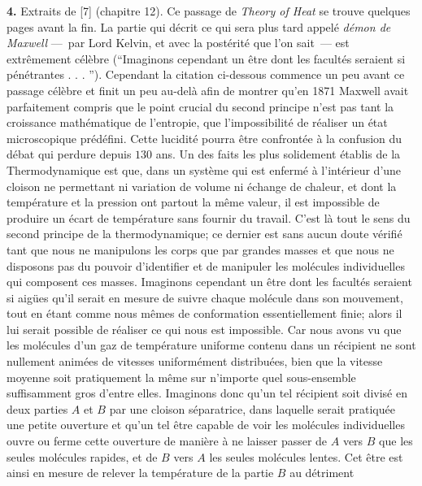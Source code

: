{\bf 4.}\hskip3mm Extraits de [7] (chapitre 12). Ce passage de 
{\it Theory of Heat} se trouve quelques pages avant la fin. La partie qui
d\'ecrit ce qui sera plus tard appel\'e {\it d\'emon de Maxwell} ---~par
Lord Kelvin,  et avec la post\'erit\'e que l'on sait~--- est extr\^emement
c\'el\`ebre (``Imaginons cependant un \^etre dont les facult\'es seraient
si p\'en\'etrantes  . . . '').  Cependant la citation ci-dessous commence
un peu avant ce passage c\'el\`ebre et finit un peu au-del\`a afin de
montrer qu'en 1871 Maxwell avait parfaitement compris que le point
crucial du second principe n'est pas tant la croissance math\'ematique 
de l'entropie, que l'impossibilit\'e de r\'ealiser un \'etat microscopique 
pr\'ed\'efini. Cette lucidit\'e pourra \^etre confront\'ee \`a la confusion 
du d\'ebat qui perdure depuis $130$ ans. 
\medskip
{\cit  Un des faits les plus solidement \'etablis de la Thermodynamique
est que, dans un syst\`eme qui est enferm\'e \`a l'int\'erieur d'une 
cloison ne permettant ni variation de volume ni \'echange de chaleur, 
et dont la temp\'erature et la pression ont partout la m\^eme valeur,
il est impossible de produire un \'ecart de temp\'erature sans fournir 
du travail. C'est l\`a tout le sens du second principe de la 
thermodynamique; ce dernier est sans aucun doute v\'erifi\'e tant que 
nous ne manipulons les corps que par grandes masses et que nous ne 
disposons pas du pouvoir d'identifier et de manipuler les mol\'ecules 
individuelles qui composent ces masses. Imaginons cependant un \^etre 
dont les facult\'es seraient si aig\"ues qu'il serait en mesure de 
suivre chaque mol\'ecule dans son mouvement, tout en \'etant comme nous 
m\^emes de  conformation essentiellement finie; alors il lui serait 
possible de r\'ealiser ce qui nous est impossible. Car nous avons vu 
que les mol\'ecules d'un gaz de temp\'erature uniforme contenu dans  
un r\'ecipient ne sont nullement anim\'ees de vitesses uniform\'ement 
distribu\'ees, bien que la vitesse moyenne soit pratiquement 
la m\^eme sur n'importe quel sous-ensemble suffisamment gros d'entre elles. 
Imaginons donc qu'un tel r\'ecipient soit divis\'e en deux parties $A$ et 
$B$ par une cloison s\'eparatrice, dans laquelle serait pratiqu\'ee une 
petite ouverture et qu'un tel \^etre capable de voir les mol\'ecules 
individuelles ouvre ou ferme cette ouverture de mani\`ere \`a ne 
laisser passer de $A$ vers $B$ que les seules mol\'ecules rapides, et 
de $B$ vers $A$ les seules mol\'ecules lentes. Cet \^etre est ainsi 
en mesure de relever la temp\'erature de la partie $B$ au d\'etriment 
}

